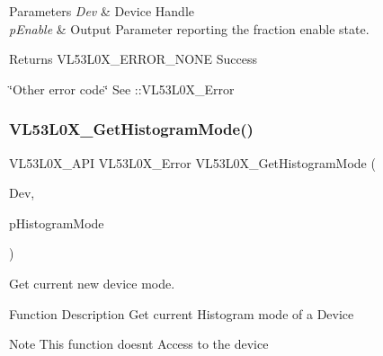 \begin{DoxyParams}{Parameters}
{\em Dev} & Device Handle \\
\hline
{\em p\+Enable} & Output Parameter reporting the fraction enable state.\\
\hline
\end{DoxyParams}
\begin{DoxyReturn}{Returns}
V\+L53\+L0\+X\+\_\+\+E\+R\+R\+O\+R\+\_\+\+N\+O\+NE Success 

\char`\"{}\+Other error code\char`\"{} See \+::\+V\+L53\+L0\+X\+\_\+\+Error 
\end{DoxyReturn}
\mbox{\label{group__VL53L0X__parameters__group_gaea90e545569556a6e2f6e0bc3e3b92dd}} 
\subsubsection{\texorpdfstring{V\+L53\+L0\+X\+\_\+\+Get\+Histogram\+Mode()}{VL53L0X\_GetHistogramMode()}}
{\footnotesize\ttfamily V\+L53\+L0\+X\+\_\+\+A\+PI V\+L53\+L0\+X\+\_\+\+Error V\+L53\+L0\+X\+\_\+\+Get\+Histogram\+Mode (\begin{DoxyParamCaption}\item[{\hyperlink{group__VL53L0X__platform__group_ga2d6405308b1dd524b462f1b8fb97d167}{V\+L53\+L0\+X\+\_\+\+D\+EV}}]{Dev,  }\item[{V\+L53\+L0\+X\+\_\+\+Histogram\+Modes $\ast$}]{p\+Histogram\+Mode }\end{DoxyParamCaption})}



Get current new device mode. 

\begin{DoxyParagraph}{Function Description}
Get current Histogram mode of a Device
\end{DoxyParagraph}
\begin{DoxyNote}{Note}
This function doesn\textquotesingle{}t Access to the device
\end{DoxyNote}

